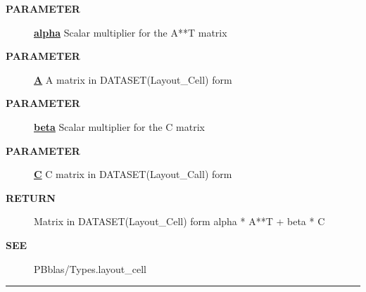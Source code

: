\par
\begin{description}
\item [\colorbox{tagtype}{\color{white} \textbf{\textsf{PARAMETER}}}] \textbf{\underline{alpha}} Scalar multiplier for the A**T matrix
\item [\colorbox{tagtype}{\color{white} \textbf{\textsf{PARAMETER}}}] \textbf{\underline{A}} A matrix in DATASET(Layout\_Cell) form
\item [\colorbox{tagtype}{\color{white} \textbf{\textsf{PARAMETER}}}] \textbf{\underline{beta}} Scalar multiplier for the C matrix
\item [\colorbox{tagtype}{\color{white} \textbf{\textsf{PARAMETER}}}] \textbf{\underline{C}} C matrix in DATASET(Layout\_Call) form
\item [\colorbox{tagtype}{\color{white} \textbf{\textsf{RETURN}}}] \textbf{\underline{}} Matrix in DATASET(Layout\_Cell) form alpha * A**T + beta * C
\item [\colorbox{tagtype}{\color{white} \textbf{\textsf{SEE}}}] \textbf{\underline{}} PBblas/Types.layout\_cell
\end{description}

\rule{\linewidth}{0.5pt}

